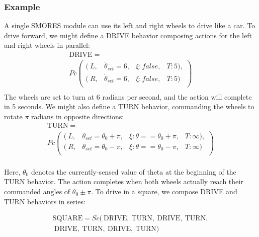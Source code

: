 \documentclass[conference]{IEEEtran}
\theoremstyle{definition}
\begin{document}
\subsubsection*{Example}
A single SMORES module can use its left and right wheels to drive like a car. To
drive forward, we might define a DRIVE behavior composing actions for  the left and right wheels
in parallel:\begin{align*}
\mathrm{DRIVE} =~~~~~~~~~~~~~~~~~~~~~~~~~~~~~~~~~~~~~~~~~~~~~~~~~~~ \\
Pc \left( \begin{array}{cccc}
(~L, & \dot\theta_{set}=6, & \xi:false, & T:5), \\
(~R, & \dot\theta_{set}=6, & \xi:false, & T:5) \\
\end{array} \right)\\
\end{align*}
The wheels are set to turn at 6 radians per second, and the action will complete
in 5 seconds.  We might also define a TURN behavior, commanding the wheels to rotate \(\pi\) radians
in opposite directions:
\begin{align*}
\mathrm{TURN} =~~~~~~~~~~~~~~~~~~~~~~~~~~~~~~~~~~~~~~~~~~~~~~~~~~~~~~~~~~~~ \\
Pc \left( \begin{array}{cccc}
(~L, & \theta_{set}=\theta_0+\pi, & \xi:\theta==\theta_0+\pi, & T:\infty), \\
(~R, & \theta_{set}=\theta_0-\pi, & \xi:\theta==\theta_0-\pi, & T:\infty) \\
\end{array} \right)\\
\end{align*}

Here, \(\theta_0\) denotes the currently-sensed value of theta at the beginning of
the TURN behavior.
The action completes when both wheels actually reach their commanded angles of \(\theta_0\pm\pi\). To drive in a square, we compose DRIVE and TURN behaviors in series:

\begin{align*}
\mathrm{SQUARE} = Sc (~\mathrm{DRIVE},~\mathrm{TURN},~\mathrm{DRIVE},~\mathrm{TURN},\\
~\mathrm{DRIVE},~\mathrm{TURN},~\mathrm{DRIVE},~\mathrm{TURN} )
\end{align*}
\end{document}

